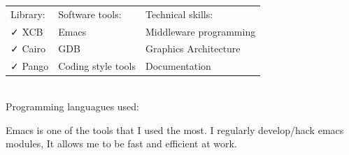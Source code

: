 \documentclass[letterpaper]{jm-cv} %
\begin{document}
\begin{tabular}{ l l l }
  Library: & \hspace{1cm}Software tools: & \hspace{1cm}Technical skills:\\
  {\color{mainblue}\faCheck} XCB &
  \hspace{1cm}{\color{maingreen}\faCheck} Emacs &
  \hspace{1cm}{\color{maingray}\faCheck} Middleware programming\\

  {\color{mainblue}\faCheck} Cairo &
  \hspace{1cm}{\color{maingreen}\faCheck} GDB &
  \hspace{1cm}{\color{maingray}\faCheck} Graphics Architecture\\

  {\color{mainblue}\faCheck} Pango &
  \hspace{1cm}{\color{maingreen}\faCheck} Coding style tools &
  \hspace{1cm}{\color{maingray}\faCheck} Documentation\\

\end{tabular}\\

Programming languagues used:\\

\divider

{\large{\color{maingray}\bullet}}

Emacs is one of the tools that I used the most.
I regularly develop/hack emacs modules, It allows me to be fast and efficient at work.
\end{document}
